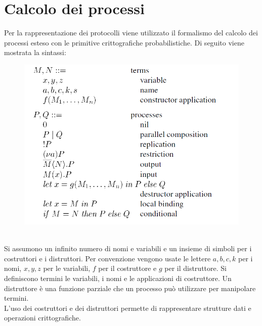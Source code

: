 \documentclass[12pt]{article}
\begin{document}
\section*{Calcolo dei processi}
Per la rappresentazione dei protocolli viene utilizzato il formalismo del calcolo dei processi esteso con le primitive crittografiche probabilistiche. Di seguito viene mostrata la sintassi:\\
\begin{figure}[h]
        \centering
        \includegraphics[scale=0.6]{Relazione/Immagini/calcolo.PNG} 
\end{figure}\\
Si assumono un infinito numero di nomi e variabili e un insieme di simboli per i costruttori e i distruttori. Per convenzione vengono usate le lettere $a, b, c, k$ per i nomi, $x, y, z$ per le variabili, $f$ per il costruttore e $g$ per il distruttore. Si definiscono termini le variabili, i nomi e le applicazioni di costruttore. Un distruttore è una funzione parziale che un processo può utilizzare per manipolare termini.\\
L'uso dei costruttori e dei distruttori permette di rappresentare strutture dati e operazioni crittografiche.\\
\end{document}
